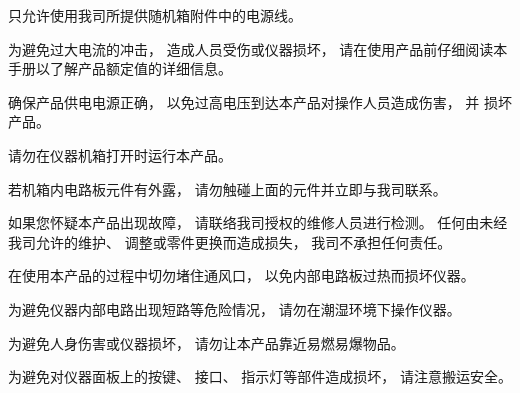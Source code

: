 \vspace{0.6cm}

只允许使用我司所提供随机箱附件中的电源线。

\vspace{0.6cm}

为避免过大电流的冲击， 造成人员受伤或仪器损坏， 请在使用产品前仔细阅读本手册以了解产品额定值的详细信息。

\vspace{0.6cm}

确保产品供电电源正确， 以免过高电压到达本产品对操作人员造成伤害， 并
损坏产品。

\vspace{0.6cm}

请勿在仪器机箱打开时运行本产品。

\vspace{0.6cm}

若机箱内电路板元件有外露， 请勿触碰上面的元件并立即与我司联系。

\vspace{0.6cm}

如果您怀疑本产品出现故障， 请联络我司授权的维修人员进行检测。 任何由未经我司允许的维护、 调整或零件更换而造成损失， 我司不承担任何责任。

\vspace{0.6cm}

在使用本产品的过程中切勿堵住通风口， 以免内部电路板过热而损坏仪器。

\vspace{0.6cm}

为避免仪器内部电路出现短路等危险情况， 请勿在潮湿环境下操作仪器。


\vspace{0.6cm}

为避免人身伤害或仪器损坏， 请勿让本产品靠近易燃易爆物品。

\vspace{0.6cm}

为避免对仪器面板上的按键、 接口、 指示灯等部件造成损坏， 请注意搬运安全。

\newpage

